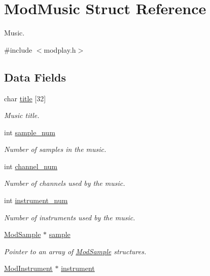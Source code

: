 \hypertarget{structModMusic}{}\section{Mod\+Music Struct Reference}
\label{structModMusic}


Music.  




{\ttfamily \#include $<$modplay.\+h$>$}

\subsection*{Data Fields}
\begin{DoxyCompactItemize}
\item 
char \hyperlink{structModMusic_a7b9e83bdae925b85b8603f9f92cc22f6}{title} \mbox{[}32\mbox{]}
\begin{DoxyCompactList}\small\item\em Music title. \end{DoxyCompactList}\item 
int \hyperlink{structModMusic_a48e325665c0b710768b8310d8e3ab1f9}{sample\+\_\+num}
\begin{DoxyCompactList}\small\item\em Number of samples in the music. \end{DoxyCompactList}\item 
int \hyperlink{structModMusic_ae0ae287338ab6864050297cdf8fb9732}{channel\+\_\+num}
\begin{DoxyCompactList}\small\item\em Number of channels used by the music. \end{DoxyCompactList}\item 
int \hyperlink{structModMusic_a56e199510a0f4107e0ddeb4d6f3cbd6e}{instrument\+\_\+num}
\begin{DoxyCompactList}\small\item\em Number of instruments used by the music. \end{DoxyCompactList}\item 
\hyperlink{structModSample}{Mod\+Sample} $\ast$ \hyperlink{structModMusic_a9e2b2e857708204d12e33d10ef467e3c}{sample}
\begin{DoxyCompactList}\small\item\em Pointer to an array of \hyperlink{structModSample}{Mod\+Sample} structures. \end{DoxyCompactList}\item 
\hyperlink{structModInstrument}{Mod\+Instrument} $\ast$ \hyperlink{structModMusic_a6683f3be02e56150252cdda5caa3dc9b}{instrument}

\end{DoxyCompactItemize}
